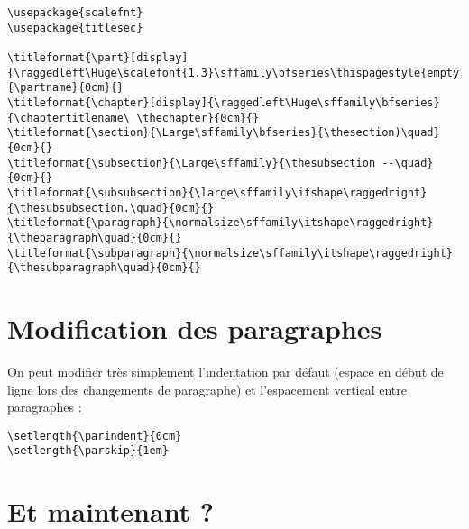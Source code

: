{\scriptsize
\begin{verbatim}
\usepackage{scalefnt}
\usepackage{titlesec}

\titleformat{\part}[display]{\raggedleft\Huge\scalefont{1.3}\sffamily\bfseries\thispagestyle{empty}}{\partname}{0cm}{}
\titleformat{\chapter}[display]{\raggedleft\Huge\sffamily\bfseries}{\chaptertitlename\ \thechapter}{0cm}{}
\titleformat{\section}{\Large\sffamily\bfseries}{\thesection)\quad}{0cm}{}
\titleformat{\subsection}{\Large\sffamily}{\thesubsection --\quad}{0cm}{}
\titleformat{\subsubsection}{\large\sffamily\itshape\raggedright}{\thesubsubsection.\quad}{0cm}{}
\titleformat{\paragraph}{\normalsize\sffamily\itshape\raggedright}{\theparagraph\quad}{0cm}{}
\titleformat{\subparagraph}{\normalsize\sffamily\itshape\raggedright}{\thesubparagraph\quad}{0cm}{}
\end{verbatim}
}


\section{Modification des paragraphes}

On peut modifier très simplement l'indentation par défaut (espace en
début de ligne lors des changements de paragraphe) et l'espacement
vertical entre paragraphes :

\begin{verbatim}
\setlength{\parindent}{0cm}
\setlength{\parskip}{1em}
\end{verbatim}



\section{Et maintenant ?}

